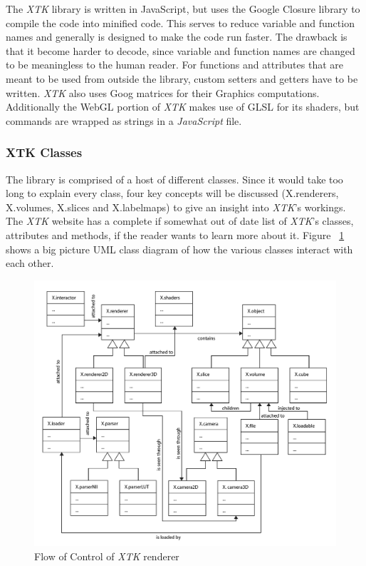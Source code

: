 \documentclass[a4paper,11pt,twoside]{article}
\begin{document}
The \textit{XTK} library is written in JavaScript, but uses the Google Closure library to compile the code into minified code. This serves to reduce variable and function names and generally is designed to make the code run faster. The drawback is that it become harder to decode, since variable and function names are changed to be meaningless to the human reader. For functions and attributes that are meant to be used from outside the library, custom setters and getters have to be written. \textit{XTK} also uses Goog matrices for their Graphics computations. Additionally the WebGL portion of \textit{XTK} makes use of GLSL for its shaders, but commands are wrapped as strings in a \textit{JavaScript} file.

\subsubsection{XTK Classes}

The library is comprised of a host of different classes. Since it would take too long to explain every class, four key concepts will be discussed (X.renderers, X.volumes, X.slices and X.labelmaps) to give an insight into \textit{XTK}'s workings. The \textit{XTK} website has a complete if somewhat out of date list of \textit{XTK}'s classes, attributes and methods, if the reader wants to learn more about it. Figure ~\ref{fig:xtkBig} shows a big picture UML class diagram of how the various classes interact with each other.


\begin{figure}[ht!]
\centering
\includegraphics[width=165mm]{graphics/xtkUML_big_01.png}
\caption{Flow of Control of \textit{XTK} renderer}
\label{fig:xtkBig}
\end{figure}
\end{document}
